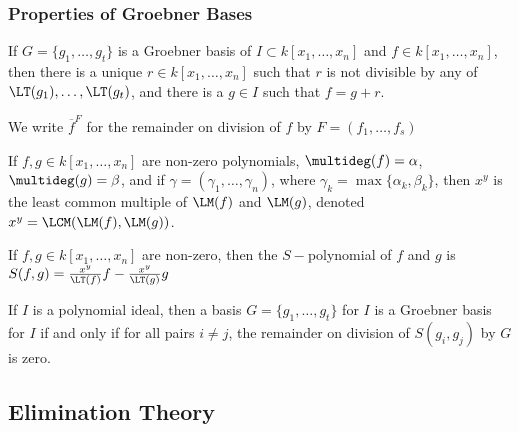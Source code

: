 \documentclass[crop=false,class=book,oneside]{standalone}
\begin{document}
\subsubsection{Properties of Groebner Bases}
\begin{theorem}
If $G=\{g_1,\hdots, g_t\}$ is a Groebner basis of $I\subset k[x_1,\hdots ,x_n]$ and $f\in k[x_1,\hdots ,x_n]$, then there is a unique $r\in k[x_1,\hdots ,x_n]$ such that $r$ is not divisible by any of $\LT(g_1),\hdots, \LT(g_t)$, and there is a $g\in I$ such that $f = g+r$. 
\end{theorem}
\begin{notation}
We write $\overline{f}^{F}$ for the remainder on division of $f$ by $F = (f_{1},\hdots,f_{s})$
\end{notation}
\begin{definition}
If $f,g\in k[x_1,\hdots ,x_n]$ are non-zero polynomials, $\multideg(f) = \alpha$, $\multideg(g) = \beta$, and if $\gamma = (\gamma_1,\hdots, \gamma_n)$, where $\gamma_k = \max\{\alpha_k,\beta_k\}$, then $x^y$ is the least common multiple of $\LM(f)$ and $\LM(g)$, denoted $x^y = \LCM(\LM(f),\LM(g))$.
\end{definition}
\begin{definition}
If $f,g\in k[x_1,\hdots ,x_n]$ are non-zero, then the $S-$polynomial of $f$ and $g$ is $S(f,g) = \frac{x^y}{\LT(f)}f - \frac{x^y}{\LT(g)}g$
\end{definition}
\begin{theorem}
If $I$ is a polynomial ideal, then a basis $G=\{g_1,\hdots, g_t\}$ for $I$ is a Groebner basis for $I$ if and only if for all pairs $i\ne j$, the remainder on division of $S(g_i,g_j)$ by $G$ is zero.
\end{theorem}
\subsection{Elimination Theory}
\end{document}
